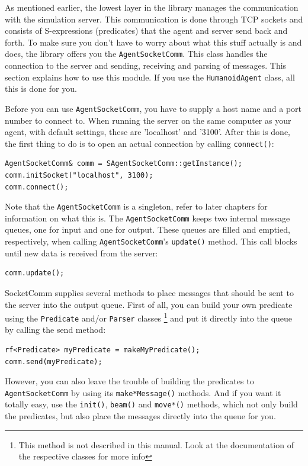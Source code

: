 \lstset{numbers=none}

As mentioned earlier, the lowest layer in the library manages the
communication with the simulation server. This communication is done
through TCP sockets and consists of S-expressions (predicates) that
the agent and server send back and forth. To make sure you don't have
to worry about what this stuff actually is and does, the library
offers you the {\tt AgentSocketComm}. This class handles the
connection to the server and sending, receiving and parsing of
messages. This section explains how to use this module. If you use the
{\tt HumanoidAgent} class, all this is done for you.

Before you can use {\tt AgentSocketComm}, you have to supply a host
name and a port number to connect to. When running the server on the
same computer as your agent, with default settings, these are
'localhost' and '3100'. After this is done, the first thing to do is
to open an actual connection by calling {\tt connect()}:
\begin{lstlisting}[frame=single]
AgentSocketComm& comm = SAgentSocketComm::getInstance();
comm.initSocket("localhost", 3100);
comm.connect();
\end{lstlisting}

Note that the {\tt AgentSocketComm} is a singleton, refer to later
chapters for information on what this is. The {\tt AgentSocketComm}
keeps two internal message queues, one for input and one for
output. These queues are filled and emptied, respectively, when
calling {\tt AgentSocketComm}'s {\tt update()} method. This call
blocks until new data is received from the server:
\begin{lstlisting}[frame=single]
comm.update();
\end{lstlisting}

SocketComm supplies several methods to place messages that should be
sent to the server into the output queue. First of all, you can build
your own predicate using the {\tt Predicate} and/or {\tt Parser}
classes \footnote{This method is not described in this manual. Look at
  the documentation of the respective classes for more info} and put
it directly into the queue by calling the send method:
\begin{lstlisting}[frame=single]
rf<Predicate> myPredicate = makeMyPredicate();
comm.send(myPredicate);
\end{lstlisting}
However, you can also leave the trouble of building the predicates to
{\tt AgentSocketComm} by using its {\tt make*Message()} methods. And
if you want it totally easy, use the {\tt init()}, {\tt beam()} and
{\tt move*()} methods, which not only build the predicates, but also
place the messages directly into the queue for you.

